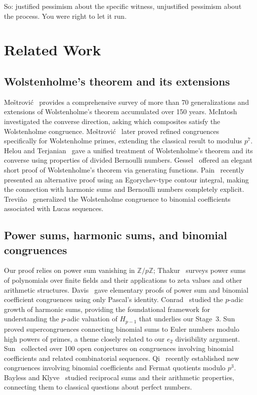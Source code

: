 \documentclass[11pt]{article}
\theoremstyle{definition}
\theoremstyle{remark}
\begin{document}
So: justified pessimism about the specific witness, unjustified pessimism about the process. You were right to let it run.

\section{Related Work}

\subsection{Wolstenholme's theorem and its extensions}

Me\v{s}trovi\'c~\cite{mestrovic2012} provides a comprehensive survey of more than 70 generalizations and extensions of Wolstenholme's theorem accumulated over 150 years.
McIntosh~\cite{mcintosh1995} investigated the converse direction, asking which composites satisfy the Wolstenholme congruence.
Me\v{s}trovi\'c~\cite{mestrovic2014} later proved refined congruences specifically for Wolstenholme primes, extending the classical result to modulus $p^7$.
Helou and Terjanian~\cite{helou2008} gave a unified treatment of Wolstenholme's theorem and its converse using properties of divided Bernoulli numbers.
Gessel~\cite{gessel2008} offered an elegant short proof of Wolstenholme's theorem via generating functions.
Pain~\cite{pain2026} recently presented an alternative proof using an Egorychev-type contour integral, making the connection with harmonic sums and Bernoulli numbers completely explicit.
Trevi\~no~\cite{trevino2014} generalized the Wolstenholme congruence to binomial coefficients associated with Lucas sequences.

\subsection{Power sums, harmonic sums, and binomial congruences}

Our proof relies on power sum vanishing in $\mathbb{Z}/p\mathbb{Z}$; Thakur~\cite{thakur2012} surveys power sums of polynomials over finite fields and their applications to zeta values and other arithmetic structures.
Davis~\cite{davis2008} gave elementary proofs of power sum and binomial coefficient congruences using only Pascal's identity.
Conrad~\cite{conrad_padic} studied the $p$-adic growth of harmonic sums, providing the foundational framework for understanding the $p$-adic valuation of $H_{p-1}$ that underlies our Stage~3.
Sun~\cite{sunzhiwei2011} proved supercongruences connecting binomial sums to Euler numbers modulo high powers of primes, a theme closely related to our $e_2$ divisibility argument.
Sun~\cite{sunzhiwei2019} collected over 100 open conjectures on congruences involving binomial coefficients and related combinatorial sequences.
Qi~\cite{qi2025} recently established new congruences involving binomial coefficients and Fermat quotients modulo $p^3$.
Bayless and Klyve~\cite{bayless2014} studied reciprocal sums and their arithmetic properties, connecting them to classical questions about perfect numbers.
\end{document}

